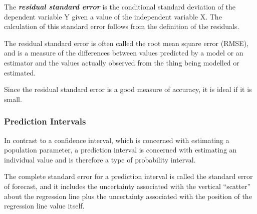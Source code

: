 The \textbf{\emph{residual standard error}} is the conditional standard deviation of the dependent variable Y given a value of the independent variable X. The calculation of this standard error follows from the definition of the residuals.

The residual standard error is often called the root mean square error (RMSE), and is a measure of the differences between values predicted by a model or an estimator and the values actually observed from the thing being modelled or estimated.

Since the residual standard error is a good measure of accuracy, it is ideal if it is small.

\subsubsection{Prediction Intervals}
In contrast to a confidence interval, which is concerned with estimating a population parameter, a prediction interval is concerned with estimating an individual value and is therefore a type of probability interval. 

The complete standard error for a prediction interval is called the standard error of forecast, and it includes the uncertainty associated with the vertical “scatter” about the regression line plus the uncertainty associated with the position of the regression line value itself.





